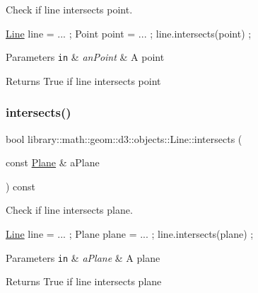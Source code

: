 Check if line intersects point. 


\begin{DoxyCode}
\hyperlink{classlibrary_1_1math_1_1geom_1_1d3_1_1objects_1_1_line_a762e529453ff9ffa9233fd73737f4692}{Line} line = ... ;
Point point = ... ;
line.intersects(point) ;
\end{DoxyCode}



\begin{DoxyParams}[1]{Parameters}
\mbox{\tt in}  & {\em an\+Point} & A point \\
\hline
\end{DoxyParams}
\begin{DoxyReturn}{Returns}
True if line intersects point 
\end{DoxyReturn}
\mbox{\label{classlibrary_1_1math_1_1geom_1_1d3_1_1objects_1_1_line_a21d031807956bafc5577ed3b5ac54cbf}} 
\subsubsection{\texorpdfstring{intersects()}{intersects()}\hspace{0.1cm}{\footnotesize\ttfamily [2/4]}}
{\footnotesize\ttfamily bool library\+::math\+::geom\+::d3\+::objects\+::\+Line\+::intersects (\begin{DoxyParamCaption}\item[{const \hyperlink{classlibrary_1_1math_1_1geom_1_1d3_1_1objects_1_1_plane}{Plane} \&}]{a\+Plane }\end{DoxyParamCaption}) const}



Check if line intersects plane. 


\begin{DoxyCode}
\hyperlink{classlibrary_1_1math_1_1geom_1_1d3_1_1objects_1_1_line_a762e529453ff9ffa9233fd73737f4692}{Line} line = ... ;
Plane plane = ... ;
line.intersects(plane) ;
\end{DoxyCode}



\begin{DoxyParams}[1]{Parameters}
\mbox{\tt in}  & {\em a\+Plane} & A plane \\
\hline
\end{DoxyParams}
\begin{DoxyReturn}{Returns}
True if line intersects plane 
\end{DoxyReturn}
\mbox{\label{classlibrary_1_1math_1_1geom_1_1d3_1_1objects_1_1_line_ab9b35d1e6276d927e9a54219855295ce}} 
